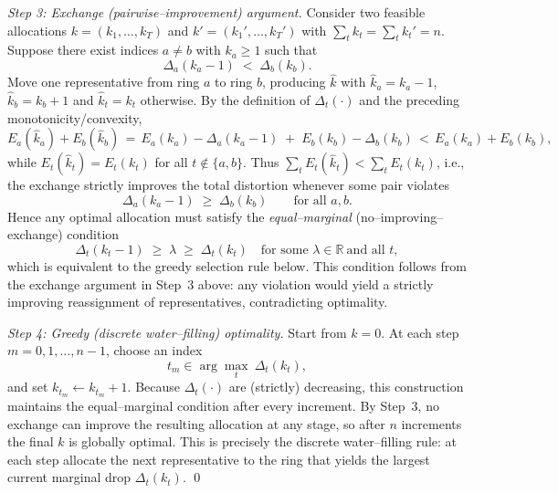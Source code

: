 \documentclass[12pt, reqno]{amsart}
\theoremstyle{plain}
\theoremstyle{definition}
\begin{document}
\smallskip
\emph{Step 3: Exchange (pairwise–improvement) argument.}
Consider two feasible allocations $ {k}=(k_1,\dots,k_T)$ and $ {k}'=(k_1',\dots,k_T')$ with $\sum_t k_t=\sum_t k_t'=n$.
Suppose there exist indices $a\neq b$ with $k_a\ge 1$ such that
\[
\Delta_a(k_a-1)\;<\;\Delta_b(k_b).
\]
Move one representative from ring $a$ to ring $b$, producing $\widehat{ {k}}$ with $\widehat{k}_a=k_a-1$, $\widehat{k}_b=k_b+1$ and $\widehat{k}_t=k_t$ otherwise.
By the definition of $\Delta_t(\cdot)$ and the preceding monotonicity/convexity,
\[
E_a(\widehat{k}_a)+E_b(\widehat{k}_b)
\,=\,E_a(k_a)-\Delta_a(k_a-1)\;+\;E_b(k_b)-\Delta_b(k_b)
\,<\,E_a(k_a)+E_b(k_b),
\]
while $E_t(\widehat{k}_t)=E_t(k_t)$ for all $t\notin\{a,b\}$. Thus $\sum_t E_t(\widehat{k}_t)<\sum_t E_t(k_t)$, i.e., the exchange strictly improves the total distortion whenever some pair violates
\[
\Delta_a(k_a-1)\;\ge\;\Delta_b(k_b)\qquad\text{for all }a,b.
\]
Hence any optimal allocation must satisfy the \emph{equal–marginal} (no–improving–exchange) condition
\[
\Delta_t(k_t-1)\;\ge\;\lambda\;\ge\;\Delta_t(k_t)
\quad\text{for some }\lambda\in\mathbb{R}\ \text{and all }t,
\]
which is equivalent to the greedy selection rule below. This condition follows from the exchange argument in Step~3 above: 
any violation would yield a strictly improving reassignment of representatives,
contradicting optimality.

\smallskip
\emph{Step 4: Greedy (discrete water–filling) optimality.}
Start from $ {k}= {0}$. At each step $m=0,1,\dots,n-1$, choose an index
\[
t_m\in\arg\max_{t}\ \Delta_t(k_t),
\]
and set $k_{t_m}\leftarrow k_{t_m}+1$. Because $\Delta_t(\cdot)$ are (strictly) decreasing, this construction maintains the equal–marginal condition after every increment. By Step~3, no exchange can improve the resulting allocation at any stage, so after $n$ increments the final $ {k}$ is globally optimal. This is precisely the discrete water–filling rule: at each step allocate the next representative to the ring that yields the largest current marginal drop $\Delta_t(k_t)$.  
\qed 

\medskip
\end{document}
